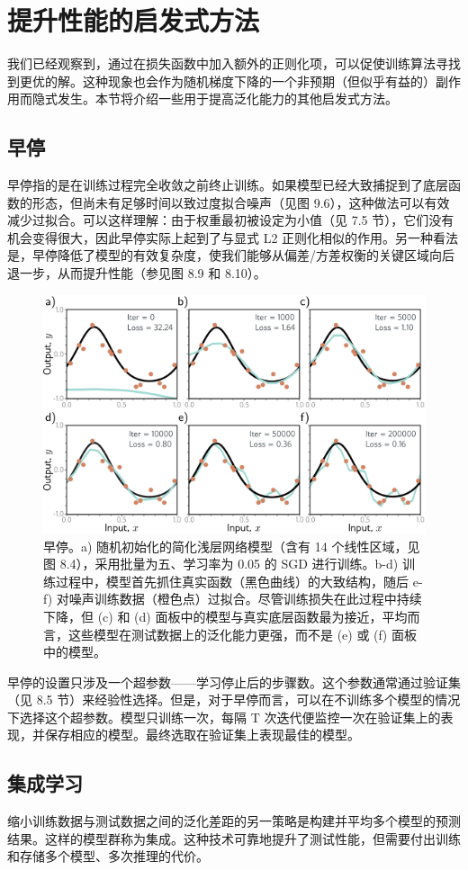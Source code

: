 \section{提升性能的启发式方法}
我们已经观察到，通过在损失函数中加入额外的正则化项，可以促使训练算法寻找到更优的解。这种现象也会作为随机梯度下降的一个非预期（但似乎有益的）副作用而隐式发生。本节将介绍一些用于提高泛化能力的其他启发式方法。
\subsection{早停}
早停指的是在训练过程完全收敛之前终止训练。如果模型已经大致捕捉到了底层函数的形态，但尚未有足够时间以致过度拟合噪声（见图 9.6），这种做法可以有效减少过拟合。可以这样理解：由于权重最初被设定为小值（见 7.5 节），它们没有机会变得很大，因此早停实际上起到了与显式 L2 正则化相似的作用。另一种看法是，早停降低了模型的有效复杂度，使我们能够从偏差/方差权衡的关键区域向后退一步，从而提升性能（参见图 8.9 和 8.10）。

\begin{figure}[ht!]
	\centering
	\includegraphics[width=0.7\linewidth]{png/chapter9/RegEarly.png}
	\caption{早停。a) 随机初始化的简化浅层网络模型（含有 14 个线性区域，见图 8.4），采用批量为五、学习率为 0.05 的 SGD 进行训练。b-d) 训练过程中，模型首先抓住真实函数（黑色曲线）的大致结构，随后 e-f) 对噪声训练数据（橙色点）过拟合。尽管训练损失在此过程中持续下降，但 (c) 和 (d) 面板中的模型与真实底层函数最为接近，平均而言，这些模型在测试数据上的泛化能力更强，而不是 (e) 或 (f) 面板中的模型。}
\end{figure}


早停的设置只涉及一个超参数——学习停止后的步骤数。这个参数通常通过验证集（见 8.5 节）来经验性选择。但是，对于早停而言，可以在不训练多个模型的情况下选择这个超参数。模型只训练一次，每隔 T 次迭代便监控一次在验证集上的表现，并保存相应的模型。最终选取在验证集上表现最佳的模型。
\subsection{集成学习}
缩小训练数据与测试数据之间的泛化差距的另一策略是构建并平均多个模型的预测结果。这样的模型群称为集成。这种技术可靠地提升了测试性能，但需要付出训练和存储多个模型、多次推理的代价。

